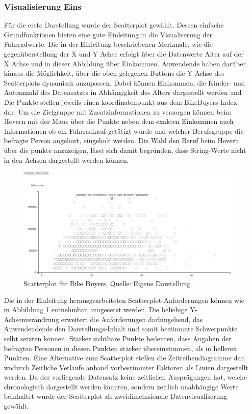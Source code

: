 \documentclass[usegeometry=true]{scrartcl}
\begin{document}
\subsubsection{Visualisierung Eins}
Für die erste Darstellung wurde der Scatterplot gewählt. Dessen einfache Grundfunktionen bieten eine gute Einleitung in die Visualiserung der Fahrradwerte. Die in der Einleitung beschriebenen Merkmale, wie die gegenüberstellung der X und Y Achse erfolgt über die Datenwerte Alter auf der X Achse und in dieser Abbildung über Einkommen. Anwendende haben darüber hinaus die Möglichkeit, über die oben gelegenen Buttons die Y-Achse des Scatterplots dynamisch anzupassen. Dabei können Einkommen, die Kinder- und Autoanzahl des Datensatzes in Abhängigkeit des Alters dargestellt werden und Die Punkte stellen jeweils einen koordinatenpunkt aus dem BikeBuyers Index dar. Um die Zielgruppe mit Zusatzinformationen zu versorgen können beim Hovern mit der Maus über die Punkte neben dem exakten Einkommen auch Informationen ob ein Fahrradkauf getätigt wurde und welcher Berufsgruppe die befragte Person angehört, eingeholt werden. Die Wahl den Beruf beim Hovern über die punkte  anzuzeigen, lässt sich damit begründen, dass String-Werte nicht in den Achsen dargestellt werden können. 
\begin{figure}[h]
\begin{center}
\includegraphics[width=16cm]{Bilder/ScatterplotV1.png}
\caption{Scatterplot für Bike Buyers, Quelle: Eigene Darstellung}
\end{center}
\end{figure}
Die in der Einleitung herausgearbeiteten Scatterplot-Anforderungen können wie in Abbildung 1 entnehmbar, umgesetzt werden. Die beliebige Y-Achsenverändrung erweitert die Anforderungen darhingehend, das Anwendendende den Darstellungs-Inhalt und somit bestinmnte Schwerpunkte selbt setzten können. Stärker sichtbare Punkte bedeuten, dass  Angaben der befragten Personen in diesen Punkten stärker übereinstimmen, als in helleren Punkten.   
Eine Alternative zum Scatterplot stellen die Zeitreihendiagramme dar, wodurch Zeitliche Verläufe anhand vorbestimmter Faktoren als Linien dargestellt werden. Da der vorliegende Datensatz keine zeitlichen Ausprägungen hat, welche chronologisch dargestellt werden könnten, sondern zeitlich unabhängige Werte beinhaltet wurde der Scatterplot als zweidimeinsionale Datenvisualiserung gewählt.
\end{document}
